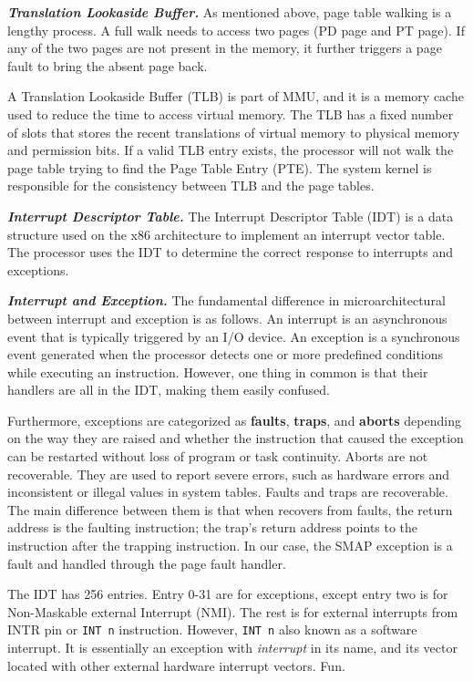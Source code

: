 \textbf{\textit{Translation Lookaside Buffer.}} As mentioned above, page table walking is a lengthy process. A full walk needs to access two pages (PD page and PT page). If any of the two pages are not present in the memory, it further triggers a page fault to bring the absent page back.

A Translation Lookaside Buffer (TLB) is part of MMU, and it is a memory cache used to reduce the time to access virtual memory. The TLB has a fixed number of slots that stores the recent translations of virtual memory to physical memory and permission bits. If a valid TLB entry exists, the processor will not walk the page table trying to find the Page Table Entry (PTE). The system kernel is responsible for the consistency between TLB and the page tables.


\textbf{\textit{Interrupt Descriptor Table.}} The Interrupt Descriptor Table (IDT) is a data structure used on the x86 architecture to implement an interrupt vector table. The processor uses the IDT to determine the correct response to interrupts and exceptions.



\textbf{\textit{Interrupt and Exception.}} The fundamental difference in microarchitectural between interrupt and exception is as follows.  An interrupt is an asynchronous event that is typically triggered by an I/O device. An exception is a synchronous event generated when the processor detects one or more predefined conditions while executing an instruction. However, one thing in common is that their handlers are all in the IDT, making them easily confused.

Furthermore, exceptions are categorized as \textbf{faults}, \textbf{traps}, and \textbf{aborts} depending on the way they are raised and whether the instruction that caused the exception can be restarted without loss of program or task continuity. Aborts are not recoverable. They are used to report severe errors, such as hardware errors and inconsistent or illegal values in system tables. Faults and traps are recoverable. The main difference between them is that when recovers from faults, the return address is the faulting instruction; the trap's return address points to the instruction after the trapping instruction. In our case, the SMAP exception is a fault and handled through the page fault handler.

The IDT has 256 entries. Entry 0-31 are for exceptions, except entry two is for Non-Maskable external Interrupt (NMI). The rest is for external interrupts from INTR pin or \texttt{INT n} instruction. However, \texttt{INT n} also known as a software interrupt. It is essentially an exception with \textit{interrupt} in its name, and its vector located with other external hardware interrupt vectors. Fun.



